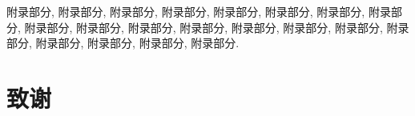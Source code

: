 \documentclass[UTF8,openright]{ctexbook}
\begin{document}
\newpage 

附录部分, 附录部分, 附录部分, 附录部分, 附录部分,
附录部分, 附录部分, 附录部分, 附录部分, 附录部分,
附录部分, 附录部分, 附录部分, 附录部分, 附录部分,
附录部分, 附录部分, 附录部分, 附录部分, 附录部分.






\clearpage{\pagestyle{fancy}\cleardoublepage}
\chapter*{致谢}

\linespread{1.4}\selectfont


\begin{flushright}

\end{flushright}



\iffalse  %

\clearpage{\pagestyle{fancy}\cleardoublepage}
\chapter*{研究成果}
\addcontentsline{toc}{chapter}{研究成果}

软件蓍作权：基于xxxx系统 V1.0

\fi
\end{document}
